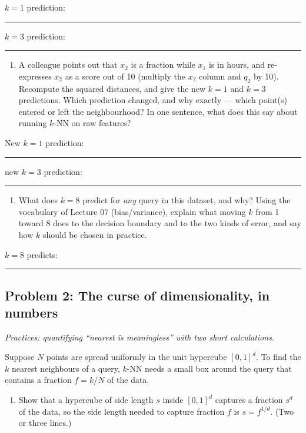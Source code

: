 \documentclass[
  11pt,
]{article}
\providecommand{\tightlist}{%
  \setlength{\itemsep}{0pt}\setlength{\parskip}{0pt}}
\newcommand{\answerspace}[1]{\par\vspace*{#1}}  %
\newcommand{\blank}[1][1.2in]{\rule{#1}{0.4pt}}
\newcommand{\answerpage}{\clearpage}
\begin{document}
\(k = 1\) prediction: \blank[0.8in]\quad \(k = 3\) prediction:
\blank[0.8in]

\answerspace{1.5in}

\begin{enumerate}
\def\labelenumi{(\alph{enumi})}
\setcounter{enumi}{1}
\tightlist
\item
  A colleague points out that \(x_2\) is a fraction while \(x_1\) is in
  hours, and re-expresses \(x_2\) as a score out of 10 (multiply the
  \(x_2\) column and \(q_2\) by 10). Recompute the squared distances,
  and give the new \(k = 1\) and \(k = 3\) predictions. Which prediction
  changed, and why exactly --- which point(s) entered or left the
  neighbourhood? In one sentence, what does this say about running
  \(k\)-NN on raw features?
\end{enumerate}

New \(k = 1\) prediction: \blank[0.8in]\quad new \(k = 3\) prediction:
\blank[0.8in]

\answerspace{2.8in}

\begin{enumerate}
\def\labelenumi{(\alph{enumi})}
\setcounter{enumi}{2}
\tightlist
\item
  What does \(k = 8\) predict for \emph{any} query in this dataset, and
  why? Using the vocabulary of Lecture 07 (bias/variance), explain what
  moving \(k\) from 1 toward 8 does to the decision boundary and to the
  two kinds of error, and say how \(k\) should be chosen in practice.
\end{enumerate}

\(k = 8\) predicts: \blank[1.2in]

\answerspace{2in}

\answerpage

\subsection{Problem 2: The curse of dimensionality, in
numbers}\label{problem-2-the-curse-of-dimensionality-in-numbers}

\emph{Practices: quantifying ``nearest is meaningless'' with two short
calculations.}

Suppose \(N\) points are spread uniformly in the unit hypercube
\([0,1]^d\). To find the \(k\) nearest neighbours of a query, \(k\)-NN
needs a small box around the query that contains a fraction \(f = k/N\)
of the data.

\begin{enumerate}
\def\labelenumi{(\alph{enumi})}
\tightlist
\item
  Show that a hypercube of side length \(s\) inside \([0,1]^d\) captures
  a fraction \(s^d\) of the data, so the side length needed to capture
  fraction \(f\) is \(s = f^{1/d}\). (Two or three lines.)
\end{enumerate}
\end{document}
